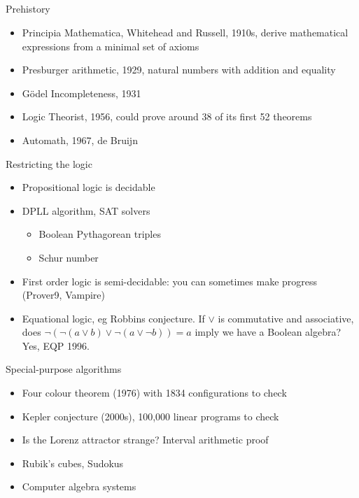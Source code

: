 \documentclass[usenames,dvipsnames,handout]{beamer}
\begin{document}
\subsection{}
\begin{frame}{Prehistory}
  \begin{itemize}[<+->]
    \item Principia Mathematica, Whitehead and Russell, 1910s, derive mathematical expressions from a minimal set of axioms
    \item Presburger arithmetic, 1929, natural numbers with addition and equality
    \item G\"{o}del Incompleteness, 1931
    \item Logic Theorist, 1956, could prove around 38 of its first 52 theorems
    \item Automath, 1967, de Bruijn
  \end{itemize}
\end{frame}
\begin{frame}{Restricting the logic}
  \begin{itemize}[<+->]
    \item Propositional logic is decidable
    \item DPLL algorithm, SAT solvers
      \begin{itemize}
        \item Boolean Pythagorean triples
        \item Schur number
      \end{itemize}
    \item First order logic is semi-decidable: you can sometimes make progress (Prover9, Vampire)
    \item Equational logic, eg Robbins conjecture. If $\lor$ is commutative and associative, does $\lnot (\lnot (a \lor b) \lor \lnot (a \lor \lnot b)) = a$ imply we have a Boolean algebra? Yes, EQP 1996.
  \end{itemize}
\end{frame}
\begin{frame}{Special-purpose algorithms}
  \begin{itemize}[<+->]
      \item Four colour theorem (1976) with 1834 configurations to check
      \item Kepler conjecture (2000s), 100,000 linear programs to check
      \item Is the Lorenz attractor strange? Interval arithmetic proof
      \item Rubik's cubes, Sudokus
      \item Computer algebra systems
  \end{itemize}
\end{frame}
\end{document}
